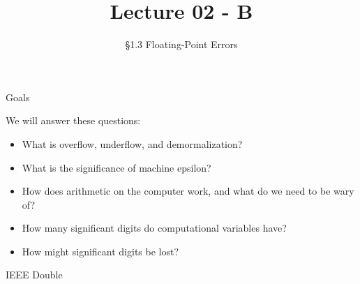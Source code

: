 \documentclass[10pt]{beamer}
\title[Math/CS 375]{Lecture 02 - B}
\subtitle{\S 1.3 Floating-Point Errors}
\date{}
\begin{document}
\begin{frame}
  \titlepage
\end{frame}
\begin{frame}{Goals}

We will answer these questions:\\[3mm]
\begin{itemize}
    \item What is overflow, underflow, and demormalization? 
    
    \item What is the significance of machine epsilon? 
    
    \item How does arithmetic on the computer work, and what do we need to be wary of?

    \item How many significant digits do computational variables have? 

    \item How might significant digits be lost?
\end{itemize}
    
\end{frame}



\begin{frame}{IEEE Double}

{}
\begin{center}
\end{center}


\end{frame}

\end{document}
